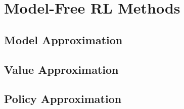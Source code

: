 \section{Model-Free RL Methods}


\subsection{Model Approximation}


\subsection{Value Approximation}


\subsection{Policy Approximation}






